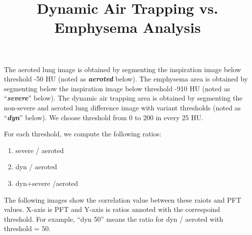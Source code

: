 \documentclass[12pt]{article}
\title{Dynamic Air Trapping vs. Emphysema Analysis }
\date{}
\begin{document}
\maketitle

The aeroted lung image is obtained by segmenting the inspiration image below threshold -50 HU (noted as \textbf{\textit{aeroted}} below). The emphysema area is obtained by segmenting below the inspiration image below threshold -910 HU (noted as ``\textbf{\textit{severe}}'' below). The dynamic air trapping area is obtained by segmenting the non-severe and aeroted lung difference image with variant thresholds (noted as ``\textbf{\textit{dyn}}'' below). We choose threshold from 0 to 200 in every 25 HU.

For each threshold, we compute the following ratios:
\begin{enumerate}
 \item severe / aeroted
 \item dyn / aeroted
 \item dyn+severe /aeroted
\end{enumerate}

The following images show the correlation value between these raiots and PFT values. X-axis is PFT and Y-axis is ratios annoted with the correspoind threshold. For example, ``dyn 50'' means the ratio for dyn / aeroted with threshold = 50.
\end{document}
